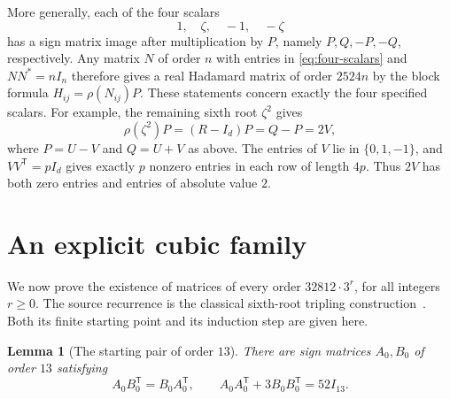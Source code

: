 \documentclass[10pt]{article}
\newtheorem{lemma}[theorem]{Lemma}
\begin{document}
More generally, each of the four scalars
\begin{equation}\label{eq:four-scalars}
 1,\quad\zeta,\quad-1,\quad-\zeta
\end{equation}
has a sign matrix image after multiplication by $P$, namely
$P,Q,-P,-Q$, respectively. Any matrix $N$ of order $n$ with entries
in \eqref{eq:four-scalars} and $NN^*=nI_n$ therefore gives a real
Hadamard matrix of order $2524n$ by the block formula
$H_{ij}=\rho(N_{ij})P$.
These statements concern exactly the four specified scalars.
For example, the remaining sixth root $\zeta^2$ gives
\[
 \rho(\zeta^2)P=(R-I_d)P=Q-P=2V,
\]
where $P=U-V$ and $Q=U+V$ as above. The entries of $V$ lie in
$\{0,1,-1\}$, and $VV^{\mathsf T}=pI_d$ gives exactly $p$ nonzero
entries in each row of length $4p$. Thus $2V$ has both zero entries and
entries of absolute value $2$.

\section{An explicit cubic family}
\label{sec:cubic-family}

We now prove the existence of matrices of every order
$32812\cdot3^r$, for all integers $r\geq0$. The source recurrence is
the classical sixth-root tripling construction~\cite{unreal}. Both its
finite starting point and its induction step are given here.

\begin{lemma}[The starting pair of order $13$]\label{lem:seed13}
There are sign matrices $A_0,B_0$ of order $13$ satisfying
\begin{equation}\label{eq:cubic-pair}
 A_0B_0^{\mathsf T}=B_0A_0^{\mathsf T},\qquad
 A_0A_0^{\mathsf T}+3B_0B_0^{\mathsf T}=52I_{13}.
\end{equation}
\end{lemma}
\end{document}
